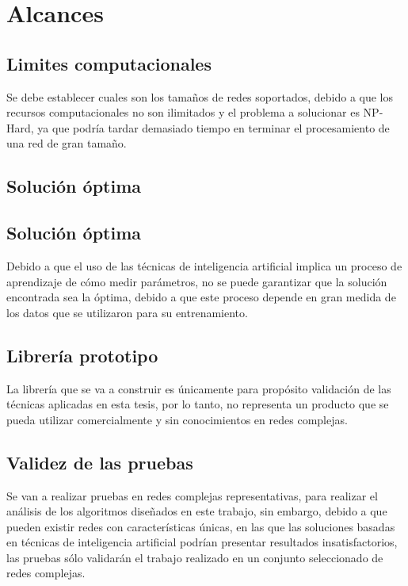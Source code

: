 \section{Alcances}

\subsection{Limites computacionales}
Se debe establecer cuales son los tamaños de redes soportados, debido a que los recursos computacionales no son ilimitados y el problema a solucionar es NP-Hard, ya que podría tardar demasiado tiempo en terminar el procesamiento de una red de gran tamaño.
\subsection{Solución óptima}

\subsection{Solución óptima}
Debido a que el uso de las técnicas de inteligencia artificial implica un proceso de aprendizaje de cómo medir parámetros, no se puede garantizar que la solución encontrada sea la
óptima, debido a que este proceso depende en gran medida de los datos que se utilizaron para
su entrenamiento.
\subsection{Librería prototipo}

La librería que se va a construir es únicamente para propósito validación de las técnicas aplicadas en esta tesis, por lo tanto, no representa un producto que se pueda utilizar comercialmente y sin conocimientos en redes complejas.
\subsection{Validez de las pruebas}

Se van a realizar pruebas en redes complejas representativas, para realizar el análisis de los algoritmos diseñados en este trabajo, sin embargo, debido a que pueden existir redes con características únicas, en las que las soluciones basadas en técnicas de inteligencia artificial podrían presentar resultados insatisfactorios, las pruebas sólo validarán el trabajo realizado en un conjunto seleccionado de redes complejas.
